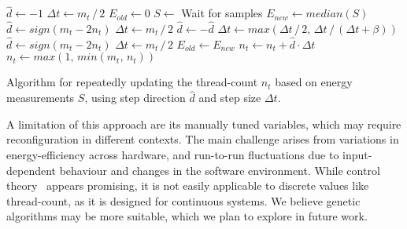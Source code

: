 \begin{algorithm}[!ht]
    \begin{algorithmic}[1]
            \State $\hat{d} \gets -1$
            \State $\Delta t \gets m_t\, /\, 2$
            \State $E_{old} \gets 0$
            \Loop
                \State $S \gets$ Wait for samples
                \State $E_{new} \gets median(S)$
                    \State $\hat{d} \gets sign(m_t - 2 n_t)$
                    \State $\Delta t \gets m_t\, /\, 2$
                \Else
                        \State $\hat{d} \gets -\hat{d}$
                    \EndIf
                        \State $\Delta t \gets max(\Delta t\, /\, 2,\, \Delta t\, /\, (\Delta t + \beta))$
                    \Else
                        \State $\hat{d} \gets sign(m_t - 2 n_t)$
                        \State $\Delta t \gets m_t\, /\, 2$
                    \EndIf
                \EndIf
                \State $E_{old} \gets E_{new}$
                \State $n_t \gets n_t + \hat{d} \cdot \Delta t$
                \State $n_t \gets max(1,\, min(m_t,\, n_t))$
            \EndLoop
    \end{algorithmic}%
    \caption{Algorithm for repeatedly updating the thread-count $n_t$ based on energy measurements
    $S$, using step direction $\hat{d}$ and step size $\Delta t$.}
    \label{alg:controller}
\end{algorithm}

A limitation of this approach are its manually tuned variables, which may require reconfiguration in
different contexts. The main challenge arises from variations in energy-efficiency across hardware,
and run-to-run fluctuations due to input-dependent behaviour and changes in the software
environment. While control theory~\cite{control-theory} appears promising, it is not easily
applicable to discrete values like thread-count, as it is designed for continuous systems. We
believe genetic algorithms may be more suitable, which we
plan to explore in future work.
